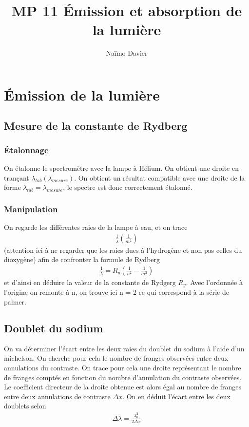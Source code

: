 \documentclass[12pt,prb,aps,epsf]{article}
\begin{document}
	
	\title{MP 11 Émission et absorption de la lumière}
	\author{Naïmo Davier}
	
	\maketitle
	
	\tableofcontents
	
	\pagebreak
	
	
\section{Émission de la lumière}
\subsection{Mesure de la constante de Rydberg}
\subsubsection{Étalonnage}
On étalonne le spectromètre avec la lampe à Hélium. On obtient une droite en trançant $\lambda_{tab} (\lambda_{mesure})$. On obtient un résultat compatible avec une droite de la forme $\lambda_{tab} = \lambda_{mesure}$, le spectre est donc correctement étalonné.

\subsubsection{Manipulation}
On regarde les différentes raies de la lampe à eau, et on trace 
\begin{eqnarray}
\frac{1}{\lambda}(\frac{1}{m^2})
\end{eqnarray}
(attention ici à ne regarder que les raies dues à l'hydrogène et non pas celles du dioxygène) afin de confronter la formule de Rydberg
\begin{eqnarray}
\frac{1}{\lambda} = R_y\left(\frac{1}{n^2}-\frac{1}{m^2}\right)
\end{eqnarray}
et d'ainsi en déduire la valeur de la constante de Rydgerg $R_y$. Avec l'ordonnée à l'origine on remonte à n, on trouve ici n = 2 ce qui correspond à la série de palmer.

\subsection{Doublet du sodium}
On va déterminer l'écart entre les deux raies du doublet du sodium à l'aide d'un michelson. On cherche pour cela le nombre de franges observées entre deux annulations du contraste. On trace pour cela une droite représentant le nombre de franges comptés en fonction du nombre d'annulation du contraste observées. Le coefficient directeur de la droite obtenue est alors égal au nombre de franges entre deux annulations de contraste $\Delta x$.
On en déduit l'écart entre les deux doublets selon
\begin{eqnarray}
\Delta \lambda = \frac{\lambda_0^2}{2\Delta x}
\end{eqnarray}
\end{document}
